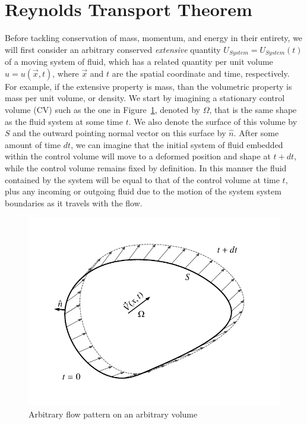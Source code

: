 \section{Reynolds Transport Theorem}
Before tackling conservation of mass, momentum, and energy in their entirety, we will first consider an arbitrary conserved {\it extensive} quantity $U_{System} = U_{System}(t)$ of a moving system of fluid, which has a related quantity per unit volume $u = u(\vec{x},t)$, where $\vec{x}$ and $t$ are the spatial coordinate and time, respectively. For example, if the extensive property is mass, than the volumetric property is mass per unit volume, or density. We start by imagining a stationary control volume (CV) such as the one in Figure~\ref{fig:reynolds_transport_volume}, denoted by $\Omega$, that is the same shape as the fluid system at some time $t$. We also denote the surface of this volume by $S$ and the outward pointing normal vector on this surface by $\hat{n}$. After some amount of time $dt$, we can imagine that the initial system of fluid embedded within the control volume will move to a deformed position and shape at $t + dt$, while the control volume remains fixed by definition. In this manner the fluid contained by the system will be equal to that of the control volume at time $t$, plus any incoming or outgoing fluid due to the motion of the system system boundaries as it travels with the flow.
\begin{figure}[htbp]
	\centering
	\includegraphics[width=0.5\linewidth]{Pictures/reytrans_volume}
	\caption{Arbitrary flow pattern on an arbitrary volume}
	\label{fig:reynolds_transport_volume}
\end{figure}

